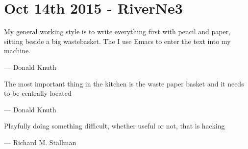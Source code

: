 \section{Oct 14th 2015 - RiverNe3}

\epigraph{My general working style is to write everything first with pencil and paper, sitting beside a big wastebasket. The I use Emacs to enter the text into my machine.}{--- \textup{Donald Knuth}}

\epigraph{The most important thing in the kitchen is the waste paper basket and it needs to be centrally located}{--- \textup{Donald Knuth}}

\epigraph{Playfully doing something difficult, whether useful or not, that is
    hacking}{--- \textup{Richard M. Stallman}}
